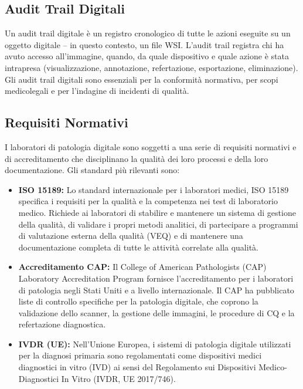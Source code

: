 \subsection{Audit Trail Digitali}

Un audit trail digitale è un registro cronologico di tutte le azioni eseguite su un oggetto
digitale -- in questo contesto, un file WSI. L'audit trail registra chi ha avuto accesso
all'immagine, quando, da quale dispositivo e quale azione è stata intrapresa (visualizzazione,
annotazione, refertazione, esportazione, eliminazione). Gli audit trail digitali sono essenziali
per la conformità normativa, per scopi medicolegali e per l'indagine di incidenti di qualità.

\subsection{Requisiti Normativi}

I laboratori di patologia digitale sono soggetti a una serie di requisiti normativi e di
accreditamento che disciplinano la qualità dei loro processi e della loro documentazione. Gli
standard più rilevanti sono:

\begin{itemize}
    \item \textbf{ISO 15189:} Lo standard internazionale per i laboratori medici, ISO 15189
    specifica i requisiti per la qualità e la competenza nei test di laboratorio medico. Richiede
    ai laboratori di stabilire e mantenere un sistema di gestione della qualità, di validare i
    propri metodi analitici, di partecipare a programmi di valutazione esterna della qualità (VEQ)
    e di mantenere una documentazione completa di tutte le attività correlate alla qualità.

    \item \textbf{Accreditamento CAP:} Il College of American Pathologists (CAP) Laboratory
    Accreditation Program fornisce l'accreditamento per i laboratori di patologia negli Stati
    Uniti e a livello internazionale. Il CAP ha pubblicato liste di controllo specifiche per la
    patologia digitale, che coprono la validazione dello scanner, la gestione delle immagini, le
    procedure di CQ e la refertazione diagnostica.

    \item \textbf{IVDR (UE):} Nell'Unione Europea, i sistemi di patologia digitale utilizzati per
    la diagnosi primaria sono regolamentati come dispositivi medici diagnostici in vitro (IVD) ai
    sensi del Regolamento sui Dispositivi Medico-Diagnostici In Vitro (IVDR, UE 2017/746).
\end{itemize}

